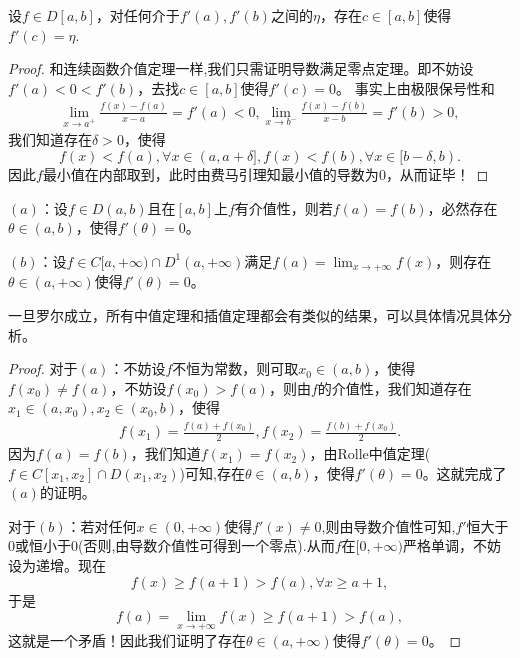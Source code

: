 \documentclass[../../main.tex]{subfiles}
\begin{document}
\begin{theorem}\label{theorem:导数介值定理}
设\(f \in D[a,b]\)，对任何介于\(f'(a),f'(b)\)之间的\(\eta\)，存在\(c \in [a,b]\)使得\(f'(c)=\eta\).
\end{theorem}
\begin{proof}
和连续函数介值定理一样,我们只需证明导数满足零点定理。即不妨设\(f'(a) < 0 < f'(b)\)，去找\(c \in [a,b]\)使得\(f'(c)=0\)。
事实上由极限保号性和
\begin{align*}
\lim_{x \to a^{+}}\frac{f(x)-f(a)}{x - a}=f'(a)<0,\lim_{x \to b^{-}}\frac{f(x)-f(b)}{x - b}=f'(b)>0,
\end{align*}
我们知道存在\(\delta>0\)，使得
\[f(x)<f(a),\forall x \in (a,a + \delta],f(x)<f(b),\forall x \in [b - \delta,b).\]
因此\(f\)最小值在内部取到，此时由费马引理知最小值的导数为\(0\)，从而证毕！

\end{proof}

\begin{theorem}[加强的Rolle中值定理]\label{theorem:加强的Rolle中值定理}
\((a)\)：设\(f \in D(a,b)\)且在\([a,b]\)上\(f\)有介值性，则若\(f(a)=f(b)\)，必然存在\(\theta \in (a,b)\)，使得\(f'(\theta)=0\)。

\((b)\)：设\(f \in C[a,+\infty)\cap D^{1}(a,+\infty)\)满足\(f(a)=\lim_{x \to +\infty}f(x)\)，则存在\(\theta \in (a,+\infty)\)使得\(f'(\theta)=0\)。
\end{theorem}
\begin{note}
一旦罗尔成立，所有中值定理和插值定理都会有类似的结果，可以具体情况具体分析。
\end{note}
\begin{proof}
对于\((a)\)：不妨设\(f\)不恒为常数，则可取\(x_0 \in (a,b)\)，使得\(f(x_0)\neq f(a)\)，不妨设\(f(x_0)>f(a)\)，则由\(f\)的介值性，我们知道存在\(x_1 \in (a,x_0),x_2 \in (x_0,b)\)，使得
\begin{align*}
f(x_1)=\frac{f(a)+f(x_0)}{2},f(x_2)=\frac{f(b)+f(x_0)}{2}.
\end{align*}
因为\(f(a)=f(b)\)，我们知道\(f(x_1)=f(x_2)\)，由Rolle中值定理($f\in C[x_1,x_2]\cap D(x_1,x_2)$)可知,存在\(\theta \in (a,b)\)，使得\(f'(\theta)=0\)。这就完成了\((a)\)的证明。

对于\((b)\)：若对任何\(x \in (0,+\infty)\)使得\(f'(x)\neq 0\),则由导数介值性可知,$f'$恒大于0或恒小于0(否则,由导数介值性可得到一个零点).从而\(f\)在\([0,+\infty)\)严格单调，不妨设为递增。现在
\[f(x)\geqslant f(a + 1)>f(a),\forall x\geqslant a + 1,\]
于是
\[f(a)=\lim_{x \to +\infty}f(x)\geqslant f(a + 1)>f(a),\]
这就是一个矛盾！因此我们证明了存在\(\theta \in (a,+\infty)\)使得\(f'(\theta)=0\)。    

\end{proof}
\end{document}
